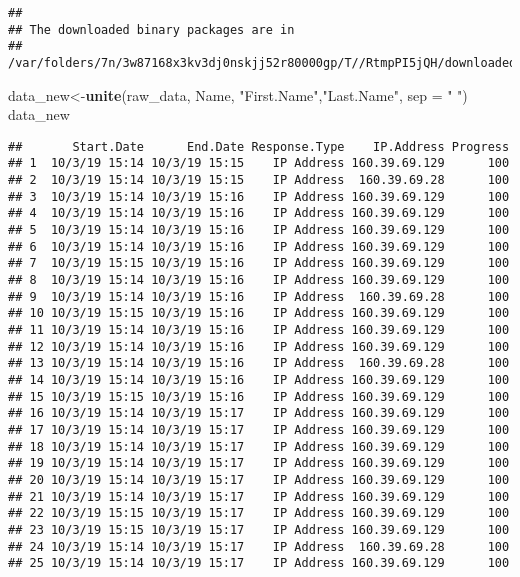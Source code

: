 \documentclass[]{article}
\newenvironment{Shaded}{\begin{snugshade}}{\end{snugshade}}
\newcommand{\DataTypeTok}[1]{\textcolor[rgb]{0.13,0.29,0.53}{#1}}
\newcommand{\KeywordTok}[1]{\textcolor[rgb]{0.13,0.29,0.53}{\textbf{#1}}}
\newcommand{\NormalTok}[1]{#1}
\newcommand{\StringTok}[1]{\textcolor[rgb]{0.31,0.60,0.02}{#1}}
\begin{document}
\begin{verbatim}
## 
## The downloaded binary packages are in
##  /var/folders/7n/3w87168x3kv3dj0nskjj52r80000gp/T//RtmpPI5jQH/downloaded_packages
\end{verbatim}

\begin{Shaded}
\begin{Highlighting}[]
\NormalTok{data_new<-}\KeywordTok{unite}\NormalTok{(raw_data, Name, }\StringTok{"First.Name"}\NormalTok{,}\StringTok{"Last.Name"}\NormalTok{, }\DataTypeTok{sep =} \StringTok{" "}\NormalTok{)}
\NormalTok{data_new}
\end{Highlighting}
\end{Shaded}

\begin{verbatim}
##       Start.Date      End.Date Response.Type    IP.Address Progress
## 1  10/3/19 15:14 10/3/19 15:15    IP Address 160.39.69.129      100
## 2  10/3/19 15:14 10/3/19 15:15    IP Address  160.39.69.28      100
## 3  10/3/19 15:14 10/3/19 15:16    IP Address 160.39.69.129      100
## 4  10/3/19 15:14 10/3/19 15:16    IP Address 160.39.69.129      100
## 5  10/3/19 15:14 10/3/19 15:16    IP Address 160.39.69.129      100
## 6  10/3/19 15:14 10/3/19 15:16    IP Address 160.39.69.129      100
## 7  10/3/19 15:15 10/3/19 15:16    IP Address 160.39.69.129      100
## 8  10/3/19 15:14 10/3/19 15:16    IP Address 160.39.69.129      100
## 9  10/3/19 15:14 10/3/19 15:16    IP Address  160.39.69.28      100
## 10 10/3/19 15:15 10/3/19 15:16    IP Address 160.39.69.129      100
## 11 10/3/19 15:14 10/3/19 15:16    IP Address 160.39.69.129      100
## 12 10/3/19 15:14 10/3/19 15:16    IP Address 160.39.69.129      100
## 13 10/3/19 15:14 10/3/19 15:16    IP Address  160.39.69.28      100
## 14 10/3/19 15:14 10/3/19 15:16    IP Address 160.39.69.129      100
## 15 10/3/19 15:15 10/3/19 15:16    IP Address 160.39.69.129      100
## 16 10/3/19 15:14 10/3/19 15:17    IP Address 160.39.69.129      100
## 17 10/3/19 15:14 10/3/19 15:17    IP Address 160.39.69.129      100
## 18 10/3/19 15:14 10/3/19 15:17    IP Address 160.39.69.129      100
## 19 10/3/19 15:14 10/3/19 15:17    IP Address 160.39.69.129      100
## 20 10/3/19 15:14 10/3/19 15:17    IP Address 160.39.69.129      100
## 21 10/3/19 15:14 10/3/19 15:17    IP Address 160.39.69.129      100
## 22 10/3/19 15:15 10/3/19 15:17    IP Address 160.39.69.129      100
## 23 10/3/19 15:15 10/3/19 15:17    IP Address 160.39.69.129      100
## 24 10/3/19 15:14 10/3/19 15:17    IP Address  160.39.69.28      100
## 25 10/3/19 15:14 10/3/19 15:17    IP Address 160.39.69.129      100

\end{verbatim}
\end{document}
